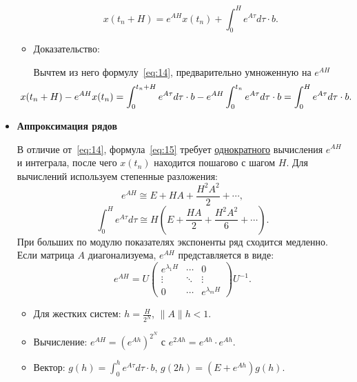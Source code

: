 \begin{itemize}[leftmargin=1em]
\begin{itemize}
			\begin{equation}
				x(t_n + H) = e^{A H} x(t_n) + \int_0^H e^{A \tau} d \tau \cdot b.
			\end{equation}
			\item Доказательство:
			\par
			Вычтем из него формулу~\eqref{eq:14}, предварительно умноженную на \( e^{AH} \)
			\begin{align}
				\hspace{-1.5em}x(t_n + H) - e^{A H} x(t_n) &= \int_0^{t_n + H} e^{A \tau} d \tau \cdot b - e^{A H} \int_0^{t_n} e^{A \tau} d \tau \cdot b = \int_0^H e^{A \tau} d \tau \cdot b.
				\label{eq:15}
			\end{align}
		\end{itemize}
		\item \textbf{Аппроксимация рядов}
		\par
		В отличие от~\eqref{eq:14}, формула~\eqref{eq:15} требует \uline{однократного} вычисления \( e^{AH} \) и интеграла, после чего \( x(t_n) \) находится пошагово с шагом \( H \). Для вычислений используем степенные разложения:
		\begin{equation}
			e^{A H} \cong E + H A + \frac{H^2 A^2}{2} + \cdots,
		\end{equation}
		\begin{equation}
			\int_0^H e^{A \tau} d \tau \cong H \left( E + \frac{H A}{2} + \frac{H^2 A^2}{6} + \cdots \right).
		\end{equation}
		При больших по модулю показателях экспоненты ряд сходится медленно. Если матрица \(A\) диагонализуема, \(e^{AH}\) представляется в виде:
		\begin{equation}
			e^{AH} = U
			\begin{pmatrix}
				e^{\lambda_1 H} & \cdots & 0 \\
				\vdots & \ddots & \vdots \\
				0 & \cdots & e^{\lambda_m H}
			\end{pmatrix}
			U^{-1}.
		\end{equation}
		\begin{itemize}
			\item Для жестких систем: \(h = \frac{H}{2^N}\), \(\|A\| h < 1\).
			\item Вычисление: \(e^{A H} = (e^{A h})^{2^N}\) с \(e^{2 A h} = e^{A h} \cdot e^{A h}\).
			\par
			\item Вектор: \(g(h) = \int_0^h e^{A \tau} d \tau \cdot b\), \(g(2h) = (E + e^{A h}) g(h)\).
			\par

\end{itemize}
\end{itemize}
